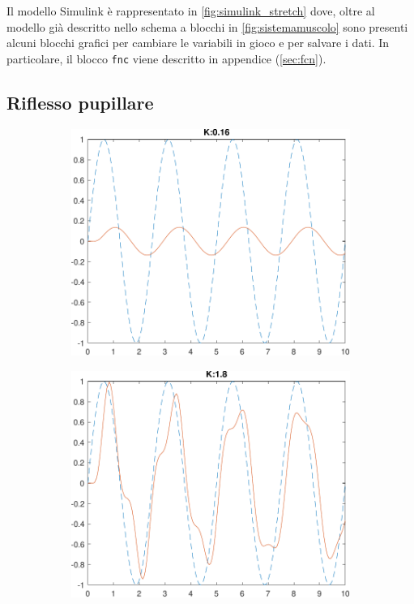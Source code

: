 Il modello Simulink è rappresentato in \cref{fig:simulink_stretch} dove, oltre al modello già descritto nello schema a blocchi in \cref{fig:sistemamuscolo} sono presenti alcuni blocchi grafici per cambiare le variabili in gioco e per salvare i dati. In particolare, il blocco \texttt{fnc} viene descritto in appendice (\cref{sec:fcn}).





\subsection{Riflesso pupillare}

\begin{figure}
	\begin{subfigure}{0.33\linewidth}
		\centering
		\includegraphics[width=0.95\linewidth]{../code/pupillary/sine/figs/result_gain_0.16}
		\caption{}
	\end{subfigure}\hfill
	\begin{subfigure}{0.33\linewidth}
		\centering
		\includegraphics[width=0.95\linewidth]{../code/pupillary/sine/figs/result_gain_1.8}

\end{subfigure}
\end{figure}
